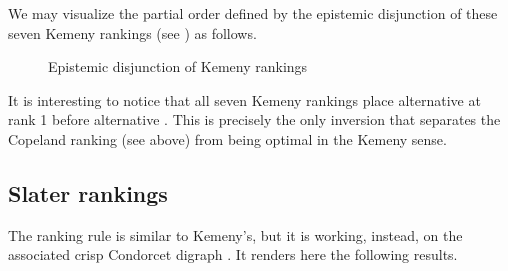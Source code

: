 \documentclass[a4paper,10pt,english]{sphinxhowto}
\begin{document}
We may visualize the partial order defined by the epistemic disjunction of these seven Kemeny rankings (see ) as follows.

\begin{sphinxVerbatim}[commandchars=\\\{\},numbers=left,firstnumber=1,stepnumber=1]
\end{sphinxVerbatim}

\begin{figure}[htbp]
\centering
\capstart

\noindent{}
\caption{Epistemic disjunction of Kemeny rankings}\label{\detokenize{tutorial:id121}}\end{figure}

It is interesting to notice that all seven Kemeny rankings place alternative  at rank 1 before alternative . This is precisely the only inversion that separates the Copeland ranking (see above) from being optimal in the Kemeny sense.


\subsection{Slater rankings}
\label{\detokenize{tutorial:slater-rankings}}
The  ranking rule is similar to Kemeny’s, but it is working, instead,  on the associated crisp Condorcet digraph . It renders here the following results.
\end{document}

